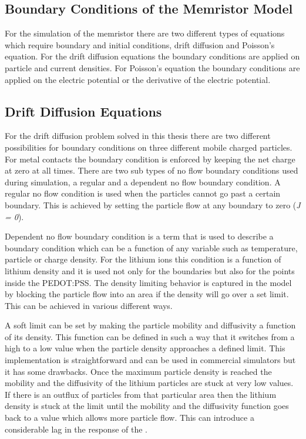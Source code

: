 \begin{doublespace}
\section{Boundary Conditions of the Memristor Model}

For the simulation of the memristor there are two different types of equations which require boundary and initial conditions, drift diffusion and Poisson's equation. For the drift diffusion equations the boundary conditions are applied on particle and current densities. For Poisson's equation the boundary conditions are applied on the electric potential or the derivative of the electric potential.
 
\subsection{Drift Diffusion Equations}

For the drift diffusion problem solved in this thesis there are two different possibilities for boundary conditions on  three different mobile charged particles. For metal contacts the boundary condition is enforced by keeping the net charge at zero at all times. There are two sub types of no flow boundary conditions used during simulation, a regular and a dependent no flow boundary condition. A regular no flow condition is used when the particles cannot go past a certain boundary. This is achieved by setting the particle flow at any boundary to zero (\textit{J = 0}). 

Dependent no flow boundary condition is a term that is used to describe a boundary condition which can be a function of any variable such as temperature, particle or charge density. For the lithium ions this condition is a function of lithium density and it is used not only for the boundaries but also for the points inside the PEDOT:PSS. The density limiting behavior is captured in the model by blocking the particle flow into an area if the density will go over a set limit. This can be achieved in various different ways. 

A soft limit can be set by making the particle mobility and diffusivity a function of its density. This function can be defined in such a way that it switches from a high to a low value when the particle density approaches a defined limit. This implementation is straightforward and can be used in commercial simulators but it has some drawbacks. Once the maximum particle density is reached the mobility and the diffusivity of the lithium particles are stuck at very low values. If there is an outflux of particles from that particular area then the lithium density is stuck at the limit until the mobility and the diffusivity function goes back to a value which allows more particle flow. This can introduce a considerable  lag in the response of the .  


\end{doublespace}

